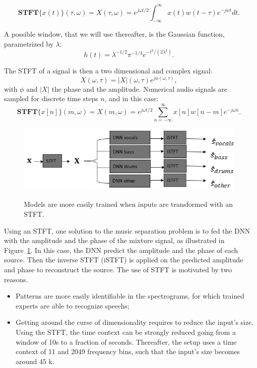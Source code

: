 $$\mathbf{STFT}\{x(t)\}(\tau,\omega) = X(\tau,\omega) = e^{j\omega t/2}\int_{-\infty}^\infty {x(t)w(t-\tau)e^{-jwt}dt}.$$

A possible window, that we will use thereafter, is the Gaussian function, parametrized by $\lambda$:
$$h(t) = \lambda^{-1/2}\pi^{-1/4}e^{-t^2/(2\lambda^2)}.$$

The STFT of a signal is then a two dimensional and complex signal:
$$X(\omega, \tau) = |X|(\omega, \tau) e^{j\phi(\omega, \tau)},$$
with $\phi$ and $|X|$ the phase and the amplitude.
Numerical audio signals are sampled for discrete time steps $n$, and in this case:
$$\mathbf {STFT} \{x[n]\}(m,\omega ) = X(m,\omega )=e^{j\omega t/2}\sum _{n=-\infty }^{\infty }x[n]w[n-m]e^{-j\omega n}.$$


\begin{figure}
  \centering
  \includegraphics[width=0.9\columnwidth]{mss-stft-2}
  \label{fig:mss-stft}
  \caption{Models are more easily trained when inputs are transformed with an STFT.}
\end{figure}

Using an STFT, one solution to the music separation problem is to fed the
DNN with the amplitude and the phase of the mixture signal,
as illustrated in Figure~\ref{fig:mss-stft}.
In this case, the DNN predict the amplitude and the phase of each source.
Then the inverse STFT (iSTFT) is applied on the predicted amplitude and phase to reconstruct the source.
The use of STFT is motivated by two reasons.

\begin{itemize}
  \item Patterns are more easily identifiable in the spectrograms, for which trained experts are able to recognize speechs;
  \item Getting around the curse of dimensionality requires to reduce the input's size. Using the STFT, the time context can be strongly reduced going from a window of 10s to a fraction of seconds. Thereafter, the setup uses a time context of 11 and 2049 frequency bins, such that the input's size becomes around 45 k.
\end{itemize}


